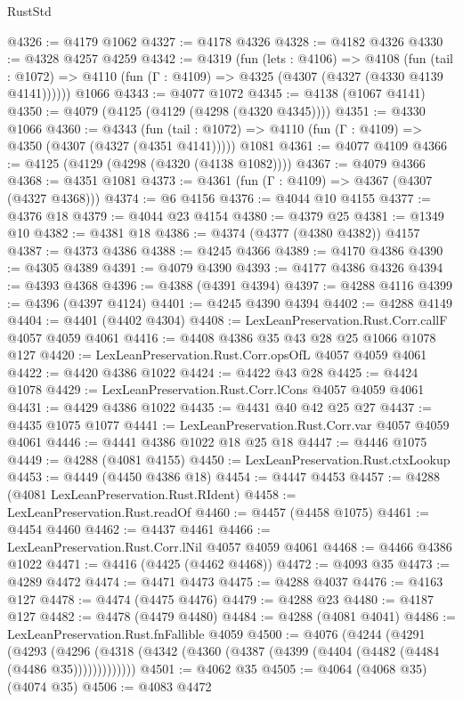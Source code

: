 \begin{lexlean}{RustStd}
\begin{coremodule}
@4326 := @4179 @1062
@4327 := @4178 @4326
@4328 := @4182 @4326
@4330 := @4328 @4257 @4259
@4342 := @4319
    (fun (lets : @4106) =>
    @4108
      (fun (tail : @1072) => @4110 (fun (Γ : @4109) => @4325 (@4307 (@4327 (@4330 @4139 @4141))))))
    @1066
@4343 := @4077 @1072
@4345 := @4138 (@1067 @4141)
@4350 := @4079 (@4125 (@4129 (@4298 (@4320 @4345))))
@4351 := @4330 @1066
@4360 := @4343
    (fun (tail : @1072) => @4110 (fun (Γ : @4109) => @4350 (@4307 (@4327 (@4351 @4141)))))
    @1081
@4361 := @4077 @4109
@4366 := @4125 (@4129 (@4298 (@4320 (@4138 @1082))))
@4367 := @4079 @4366
@4368 := @4351 @1081
@4373 := @4361 (fun (Γ : @4109) => @4367 (@4307 (@4327 @4368)))
@4374 := @6 @4156
@4376 := @4044 @10 @4155
@4377 := @4376 @18
@4379 := @4044 @23 @4154
@4380 := @4379 @25
@4381 := @1349 @10
@4382 := @4381 @18
@4386 := @4374 (@4377 (@4380 @4382)) @4157
@4387 := @4373 @4386
@4388 := @4245 @4366
@4389 := @4170 @4386
@4390 := @4305 @4389
@4391 := @4079 @4390
@4393 := @4177 @4386 @4326
@4394 := @4393 @4368
@4396 := @4388 (@4391 @4394)
@4397 := @4288 @4116
@4399 := @4396 (@4397 @4124)
@4401 := @4245 @4390 @4394
@4402 := @4288 @4149
@4404 := @4401 (@4402 @4304)
@4408 := LexLeanPreservation.Rust.Corr.callF @4057 @4059 @4061
@4416 := @4408 @4386 @35 @43 @28 @25 @1066 @1078 @127
@4420 := LexLeanPreservation.Rust.Corr.opsOfL @4057 @4059 @4061
@4422 := @4420 @4386 @1022
@4424 := @4422 @43 @28
@4425 := @4424 @1078
@4429 := LexLeanPreservation.Rust.Corr.lCons @4057 @4059 @4061
@4431 := @4429 @4386 @1022
@4435 := @4431 @40 @42 @25 @27
@4437 := @4435 @1075 @1077
@4441 := LexLeanPreservation.Rust.Corr.var @4057 @4059 @4061
@4446 := @4441 @4386 @1022 @18 @25 @18
@4447 := @4446 @1075
@4449 := @4288 (@4081 @4155)
@4450 := LexLeanPreservation.Rust.ctxLookup
@4453 := @4449 (@4450 @4386 @18)
@4454 := @4447 @4453
@4457 := @4288 (@4081 LexLeanPreservation.Rust.RIdent)
@4458 := LexLeanPreservation.Rust.readOf
@4460 := @4457 (@4458 @1075)
@4461 := @4454 @4460
@4462 := @4437 @4461
@4466 := LexLeanPreservation.Rust.Corr.lNil @4057 @4059 @4061
@4468 := @4466 @4386 @1022
@4471 := @4416 (@4425 (@4462 @4468))
@4472 := @4093 @35
@4473 := @4289 @4472
@4474 := @4471 @4473
@4475 := @4288 @4037
@4476 := @4163 @127
@4478 := @4474 (@4475 @4476)
@4479 := @4288 @23
@4480 := @4187 @127
@4482 := @4478 (@4479 @4480)
@4484 := @4288 (@4081 @4041)
@4486 := LexLeanPreservation.Rust.fnFallible @4059
@4500 := @4076
    (@4244
      (@4291
        (@4293
          (@4296 (@4318 (@4342 (@4360 (@4387 (@4399 (@4404 (@4482 (@4484 (@4486 @35)))))))))))))
@4501 := @4062 @35
@4505 := @4064 (@4068 @35) (@4074 @35)
@4506 := @4083 @4472

\end{coremodule}
\end{lexlean}
